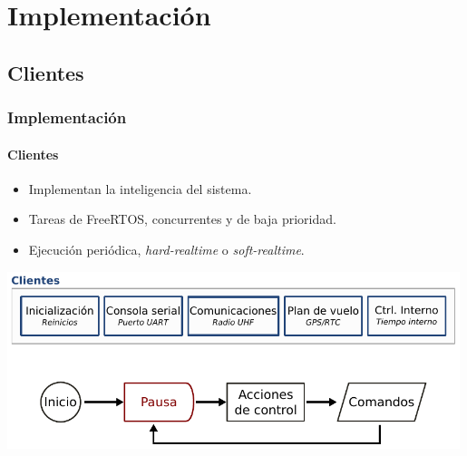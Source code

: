 \documentclass[xcolor=dvipsnames]{beamer}
\begin{document}
    \section{Implementación}
    \subsection{Clientes}
    \begin{frame}
        \frametitle{Implementación}
        \framesubtitle{Clientes}

        \begin{itemize}
            \item Implementan la inteligencia del sistema.
            \item Tareas de FreeRTOS, concurrentes y de baja prioridad.
            \item Ejecución periódica, \textit{hard-realtime} o \textit{soft-realtime}.
        \end{itemize}
        
        \begin{center}
            \includegraphics[width=0.99\textwidth]{img/implementacion_clientes.pdf}
        \end{center}
        
    \end{frame}
    
\end{document}
